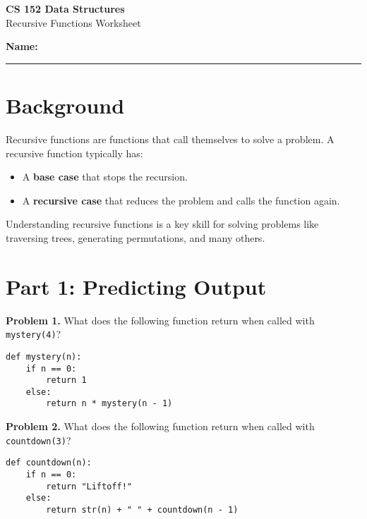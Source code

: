 \documentclass[12pt]{article}
\begin{document}
\begin{center}
    \Large \textbf{CS 152 Data Structures}\\
    \large Recursive Functions Worksheet
\end{center}

\vspace{1em}

\textbf{Name:} \rule{10cm}{0.4pt}

\vspace{1em}

\section*{Background}

Recursive functions are functions that call themselves to solve a problem. A recursive function typically has:
\begin{itemize}
    \item A \textbf{base case} that stops the recursion.
    \item A \textbf{recursive case} that reduces the problem and calls the function again.
\end{itemize}

Understanding recursive functions is a key skill for solving problems like traversing trees, generating permutations, and many others.

\section*{Part 1: Predicting Output}

\textbf{Problem 1.} What does the following function return when called with \texttt{mystery(4)}?

\begin{lstlisting}
def mystery(n):
    if n == 0:
        return 1
    else:
        return n * mystery(n - 1)
\end{lstlisting}

\vspace{4em}

\textbf{Problem 2.} What does the following function return when called with \texttt{countdown(3)}?

\begin{lstlisting}
def countdown(n):
    if n == 0:
        return "Liftoff!"
    else:
        return str(n) + " " + countdown(n - 1)
\end{lstlisting}

\vspace{4em}
\end{document}
